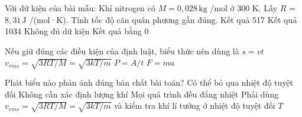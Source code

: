 \begin{ex}
Với dữ kiện của bài mẫu: Khí nitrogen có $M=0,028\,\text{kg}$ /mol ở 300 K. Lấy $R$ = $8,31\,\text{J}$ /(mol·K). Tính tốc độ căn quân phương gần đúng.
\choice
{\True Kết quả 517}
{Kết quả 1034}
{Không đủ dữ kiện}
{Kết quả bằng 0}
\end{ex}

\begin{ex}
Nếu giữ đúng các điều kiện của định luật, biểu thức nên dùng là
\choice
{$s=vt$}
{\True $v_{rms}=\sqrt{3RT/M}=\sqrt{3kT/m}$}
{$P=A/t$}
{$F=ma$}
\end{ex}

\begin{ex}
Phát biểu nào phản ánh đúng bản chất bài toán?
\choice
{Có thể bỏ qua nhiệt độ tuyệt đối}
{Không cần xác định lượng khí}
{Mọi quá trình đều đẳng nhiệt}
{\True Phải dùng $v_{rms}=\sqrt{3RT/M}=\sqrt{3kT/m}$ và kiểm tra khí lí tưởng ở nhiệt độ tuyệt đối $T$}
\end{ex}
